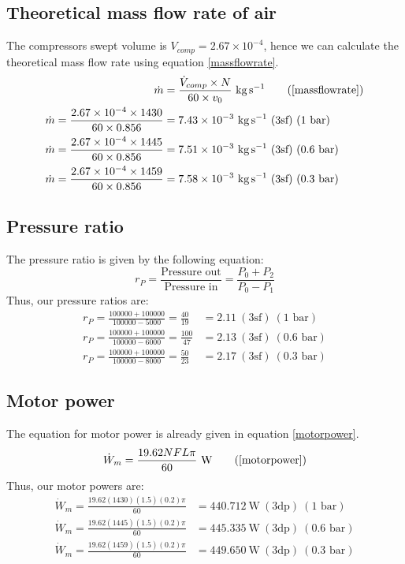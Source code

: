 \documentclass[class=article, crop=false, 12pt,a4paper]{standalone}
\numberwithin{equation}{section}
\begin{document}
\subsection{Theoretical mass flow rate of air}
The compressors swept volume is \(V_{comp} = 2.67 \times 10^{-4}\), hence we can calculate the theoretical mass flow rate using equation \ref{massflowrate}.
\begin{align}
  \dot{m} &= \frac{\dot{V}_{comp} \times N}{60 \times v_0} \ \si{\kg\per\second} \tag{\ref{massflowrate}}\\
  \dot{m} = \frac{2.67 \times 10^{-4} \times 1430}{60 \times 0.856} &= 7.43 \times 10^{-3} \ \si{\kg\per\second} \ (3\textrm{sf}) \textrm{ (1 bar)}\\
  \dot{m} = \frac{2.67 \times 10^{-4} \times 1445}{60 \times 0.856} &= 7.51 \times 10^{-3} \ \si{\kg\per\second} \ (3\textrm{sf}) \textrm{ (0.6 bar)}\\
  \dot{m} = \frac{2.67 \times 10^{-4} \times 1459}{60 \times 0.856} &= 7.58 \times 10^{-3} \ \si{\kg\per\second} \ (3\textrm{sf}) \textrm{ (0.3 bar)}
\end{align}
\subsection{Pressure ratio}
The pressure ratio is given by the following equation:
\begin{equation}
  r_P = \frac{\textrm{Pressure out}}{\textrm{Pressure in}} = \frac{P_0 + P_2}{P_0-P_1}
\end{equation}
Thus, our pressure ratios are:
\begin{align}
  r_P = \frac{100000 + 100000}{100000-5000} = \frac{40}{19} &= 2.11 \ (3\textrm{sf}) \ (1 \textrm{ bar})\\
  r_P = \frac{100000 + 100000}{100000-6000} = \frac{100}{47} &= 2.13 \ (3\textrm{sf}) \ (0.6 \textrm{ bar})\\
  r_P = \frac{100000 + 100000}{100000-8000} = \frac{50}{23} &= 2.17 \ (3\textrm{sf}) \ (0.3 \textrm{ bar})
\end{align}
\subsection{Motor power}
The equation for motor power is already given in equation \ref{motorpower}.
\begin{equation}
  \dot{W}_{m} = \frac{19.62NFL\pi}{60} \ \si{\watt}
  \tag{\ref{motorpower}}
\end{equation}
Thus, our motor powers are:
\begin{align}
  \dot{W}_{m} = \frac{19.62(1430)(1.5)(0.2)\pi}{60} &= 440.712\ \si{\watt} \ (3\textrm{dp}) \ (1 \textrm{ bar})\\
  \dot{W}_{m} = \frac{19.62(1445)(1.5)(0.2)\pi}{60} &= 445.335\ \si{\watt} \ (3\textrm{dp}) \ (0.6 \textrm{ bar})\\
  \dot{W}_{m} = \frac{19.62(1459)(1.5)(0.2)\pi}{60} &= 449.650\ \si{\watt} \ (3\textrm{dp}) \ (0.3 \textrm{ bar})
\end{align}
\end{document}
